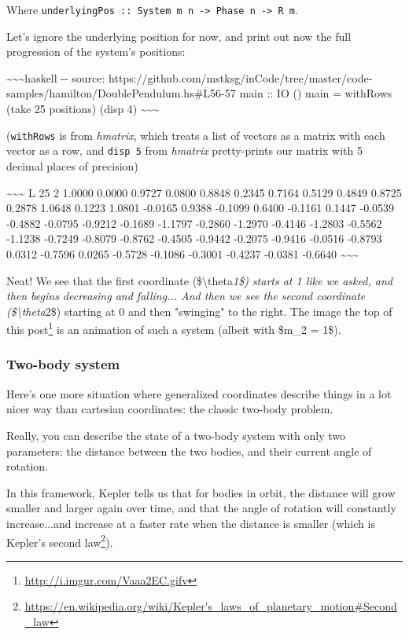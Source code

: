 \documentclass[]{article}
\renewcommand{\href}[2]{#2\footnote{\url{#1}}}
\begin{document}
Where
\texttt{underlyingPos\ ::\ System\ m\ n\ -\textgreater{}\ Phase\ n\ -\textgreater{}\ R\ m}.

Let's ignore the underlying position for now, and print out now the full
progression of the system's positions:

\textasciitilde{}\textasciitilde{}\textasciitilde{}haskell -\/- source:
https://github.com/mstksg/inCode/tree/master/code-samples/hamilton/DoublePendulum.hs\#L56-57
main :: IO () main = withRows (take 25 positions) (disp 4)
\textasciitilde{}\textasciitilde{}\textasciitilde{}

(\texttt{withRows} is from \emph{hmatrix}, which treats a list of vectors as a
matrix with each vector as a row, and \texttt{disp\ 5} from \emph{hmatrix}
pretty-prints our matrix with 5 decimal places of precision)

\textasciitilde{}\textasciitilde{}\textasciitilde{} L 25 2 1.0000 0.0000 0.9727
0.0800 0.8848 0.2345 0.7164 0.5129 0.4849 0.8725 0.2878 1.0648 0.1223 1.0801
-0.0165 0.9388 -0.1099 0.6400 -0.1161 0.1447 -0.0539 -0.4882 -0.0795 -0.9212
-0.1689 -1.1797 -0.2860 -1.2970 -0.4146 -1.2803 -0.5562 -1.1238 -0.7249 -0.8079
-0.8762 -0.4505 -0.9442 -0.2075 -0.9416 -0.0516 -0.8793 0.0312 -0.7596 0.0265
-0.5728 -0.1086 -0.3001 -0.4237 -0.0381 -0.6640
\textasciitilde{}\textasciitilde{}\textasciitilde{}

Neat! We see that the first coordinate (\$\textbackslash{}theta\emph{1\$) starts
at 1 like we asked, and then begins decreasing and falling... And then we see
the second coordinate (\$\textbackslash{}theta}2\$) starting at 0 and then
"swinging" to the right. The \href{http://i.imgur.com/Vaaa2EC.gifv}{image the
top of this post} is an animation of such a system (albeit with \$m\_2 = 1\$).

\subsubsection{Two-body system}

Here's one more situation where generalized coordinates describe things in a lot
nicer way than cartesian coordinates: the classic two-body problem.

Really, you can describe the state of a two-body system with only two
parameters: the distance between the two bodies, and their current angle of
rotation.

In this framework, Kepler tells us that for bodies in orbit, the distance will
grow smaller and larger again over time, and that the angle of rotation will
constantly increase...and increase at a faster rate when the distance is smaller
(which is
\href{https://en.wikipedia.org/wiki/Kepler's_laws_of_planetary_motion\#Second_law}{Kepler's
second law}).
\end{document}
